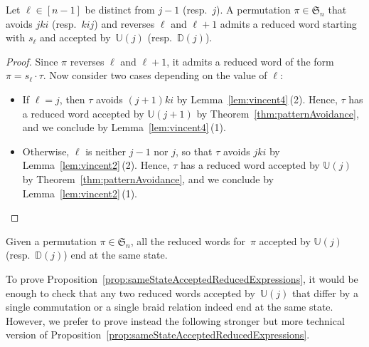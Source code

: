 \documentclass[ALCO]{cedram}
\newcommand{\fS}{\mathfrak{S}}
\newcommand{\automatonU}{\mathbb{U}}
\newcommand{\automatonD}{\mathbb{D}}
\begin{document}
\begin{proposition}\label{prop:algorithm}
Let $\ell \in [n-1]$ be distinct from $j-1$ (resp.~$j$).
A permutation $\pi \in \fS_n$ that avoids $jki$ (resp.~$kij$) and reverses $\ell$ and $\ell+1$ admits a reduced word starting with $s_\ell$ and accepted by~$\automatonU(j)$ (resp.~$\automatonD(j)$).
\end{proposition}

\begin{proof}
Since $\pi$ reverses $\ell$ and $\ell+1$, it admits a reduced word of the form~$\pi = s_\ell \cdot \tau$. Now consider two cases depending on the value of $\ell$:
\begin{itemize}
	\item If $\ell = j$, then $\tau$ avoids $(j+1)ki$ by Lemma~\ref{lem:vincent4}\,(2). Hence, $\tau$ has a reduced word accepted by $\automatonU(j+1)$ by Theorem~\ref{thm:patternAvoidance}, and we conclude by Lemma~\ref{lem:vincent4}\,(1).
	\item Otherwise, $\ell$ is neither $j-1$ nor $j$, so that $\tau$ avoids $jki$ by Lemma~\ref{lem:vincent2}\,(2). Hence, $\tau$ has a reduced word accepted by $\automatonU(j)$ by Theorem~\ref{thm:patternAvoidance}, and we conclude by Lemma~\ref{lem:vincent2}\,(1).
	\qedhere
\end{itemize}
\end{proof}

\begin{proposition}\label{prop:sameStateAcceptedReducedExpressions}
Given a permutation $\pi \in \fS_n$, all the reduced words for~$\pi$ accepted by $\automatonU(j)$ (resp.~$\automatonD(j)$) end at the same state.
\end{proposition}

To prove Proposition~\ref{prop:sameStateAcceptedReducedExpressions}, it would be enough to check that any two reduced words accepted by~$\automatonU(j)$ that differ by a single commutation or a single braid relation indeed end at the same state.
However, we prefer to prove instead the following stronger but more technical version of Proposition~\ref{prop:sameStateAcceptedReducedExpressions}.
\end{document}
